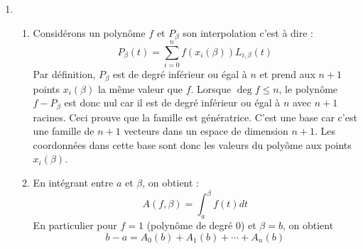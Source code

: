 \begin{enumerate}
 \item \begin{enumerate}
 \item Considérons un polynôme $f$ et $P_\beta$ son interpolation c'est à dire :
\begin{displaymath}
 P_\beta(t) = \sum_{i=0}^nf(x_i(\beta))L_{i,\beta}(t)
\end{displaymath}
Par définition, $P_\beta$ est de degré inférieur ou égal à $n$ et prend aux $n+1$ points $x_i(\beta)$ la même valeur que $f$. Lorsque $\deg f\leq n$, le polynôme $f-P_\beta$ est donc nul car il est de degré inférieur ou égal à $n$ avec $n+1$ racines. Ceci prouve que la famille est génératrice. C'est une base car c'est une famille de $n+1$ vecteurs dans un espace de dimension $n+1$. Les coordonnées dans cette base sont donc les valeurs du polyôme aux points $x_i(\beta)$.
\item En intégrant entre $a$ et $\beta$, on obtient :
\begin{displaymath}
 A(f,\beta) = \int_{a}^{\beta}f(t)dt
\end{displaymath}
En particulier pour $f=1$ (polynôme de degré $0$) et $\beta=b$, on obtient 
\begin{displaymath}
 b-a = A_0(b)+A_1(b)+\cdots+A_n(b)
\end{displaymath}
\end{enumerate}


\end{enumerate}

